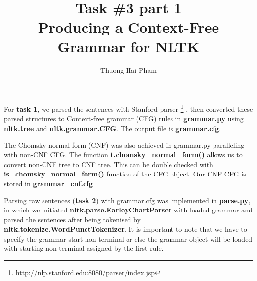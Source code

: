 \documentclass[12pt]{article}
\title{Task \#3 part 1\\Producing a Context-Free Grammar for NLTK}
\author{Thuong-Hai Pham}
\begin{document}
\maketitle

For \textbf{task 1}, we parsed the sentences with Stanford parser \footnote{http://nlp.stanford.edu:8080/parser/index.jsp} \cite{klein2003accurate}, then converted these parsed structures to Context-free grammar (CFG) rules in \textbf{grammar.py} using \textbf{nltk.tree} and \textbf{nltk.grammar.CFG}. The output file is \textbf{grammar.cfg}. 

The Chomsky normal form (CNF) was also achieved in grammar.py paralleling with non-CNF CFG. The function \textbf{t.chomsky\_normal\_form()} allows us to convert non-CNF tree to CNF tree. This can be double checked with \textbf{is\_chomsky\_normal\_form()} function of the CFG object. Our CNF CFG is stored in \textbf{grammar\_cnf.cfg}

Parsing raw sentences (\textbf{task 2}) with grammar.cfg was implemented in \textbf{parse.py}, in which we initiated \textbf{nltk.parse.EarleyChartParser} with loaded grammar and parsed the sentences after being tokenised by \textbf{nltk.tokenize.WordPunctTokenizer}. It is important to note that we have to specify the grammar start non-terminal  or else the grammar object will be loaded with starting non-terminal assigned by the first rule.



\end{document}
